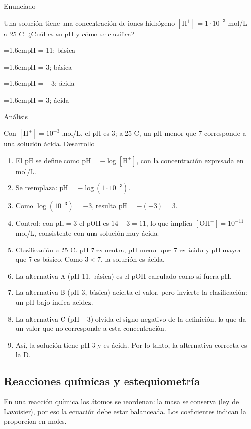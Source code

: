 \documentclass[10pt,a4paper,twocolumn]{article}
\newcommand{\alternativa}[2]{\par\noindent\hangindent=1.6em\hangafter=1\makebox[1.6em][l]{\tecla{#1}}#2\par}
\newcommand{\clave}[1]{\par\smallskip{\sffamily\footnotesize\color{esmeralda} Clave \teclaok{#1}}\par}
\begin{document}
\begin{ejemplo}
{\sffamily\footnotesize\color{zinc500} Enunciado}\par
Una solución tiene una concentración de iones hidrógeno $[\mathrm{H^+}] = 1\cdot 10^{-3}$ mol/L a 25 \textdegree{}C. ¿Cuál es su pH y cómo se clasifica?
\alternativa{A}{pH = 11; básica}
\alternativa{B}{pH = 3; básica}
\alternativa{C}{pH = $-$3; ácida}
\alternativa{D}{pH = 3; ácida}
\clave{D}
{\sffamily\footnotesize\color{zinc500} Análisis}\par Con $[\mathrm{H^+}] = 10^{-3}$ mol/L, el pH es 3; a 25 \textdegree{}C, un pH menor que 7 corresponde a una solución ácida.
{\sffamily\footnotesize\color{zinc500} Desarrollo}
\begin{enumerate}
  \item El pH se define como $\mathrm{pH} = -\log[\mathrm{H^+}]$, con la concentración expresada en mol/L.
  \item Se reemplaza: $\mathrm{pH} = -\log(1\cdot 10^{-3})$.
  \item Como $\log(10^{-3}) = -3$, resulta $\mathrm{pH} = -(-3) = 3$.
  \item Control: con $\mathrm{pH} = 3$ el $\mathrm{pOH}$ es $14 - 3 = 11$, lo que implica $[\mathrm{OH^-}] = 10^{-11}$ mol/L, consistente con una solución muy ácida.
  \item Clasificación a 25 \textdegree{}C: pH 7 es neutro, pH menor que 7 es ácido y pH mayor que 7 es básico. Como $3 < 7$, la solución es ácida.
  \item La alternativa A (pH 11, básica) es el pOH calculado como si fuera pH.
  \item La alternativa B (pH 3, básica) acierta el valor, pero invierte la clasificación: un pH bajo indica acidez.
  \item La alternativa C (pH $-$3) olvida el signo negativo de la definición, lo que da un valor que no corresponde a esta concentración.
  \item Así, la solución tiene pH 3 y es ácida. Por lo tanto, la alternativa correcta es la D.
\end{enumerate}
\end{ejemplo}

\subsection{Reacciones químicas y estequiometría}

En una reacción química los átomos se reordenan: la masa se conserva (ley de Lavoisier), por eso la ecuación debe estar balanceada. Los coeficientes indican la proporción en moles.
\end{document}
